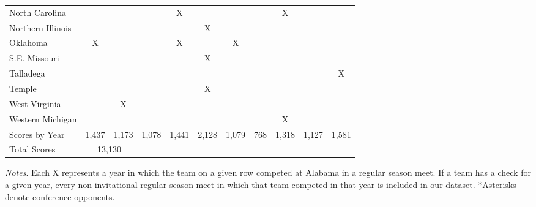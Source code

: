 \documentclass[12pt]{article}
\begin{document}
\begin{table}[htp]
\begin{threeparttable}
\begin{tabular}{lcccccccccc}
        North Carolina    &      &      &      & X    &      &      &      & X    &      &      \\
        Northern Illinois &      &      &      &      & X    &      &      &      &      &      \\
        Oklahoma          & X    &      &      & X    &      & X    &      &      &      &      \\
        S.E. Missouri     &      &      &      &      & X    &      &      &      &      &      \\
        Talladega         &      &      &      &      &      &      &      &      &      & X    \\
        Temple            &      &      &      &      & X    &      &      &      &      &      \\
        West Virginia     &      & X    &      &      &      &      &      &      &      &      \\
        Western Michigan  &      &      &      &      &      &      &      & X    &      &      \\
        \midrule
        Scores by Year     & 1,437 & 1,173 & 1,078 & 1,441 & 2,128 & 1,079 & 768 & 1,318 & 1,127 & 1,581 \\
        \cmidrule(lr){1-3}
        Total Scores & \multicolumn{2}{c}{13,130} & & & & & & & \\
        \bottomrule
    \end{tabular}

    \begin{tablenotes}[flushleft] %
        \small
        \item \textit{Notes}. Each X represents a year in which the team on a given row competed at Alabama in a regular season meet. If a team has a check for a given year, every non-invitational regular season meet in which that team competed in that year is included in our dataset. *Asterisks denote conference opponents.
    \end{tablenotes}


\end{threeparttable}
\end{table}


\clearpage
\end{document}
